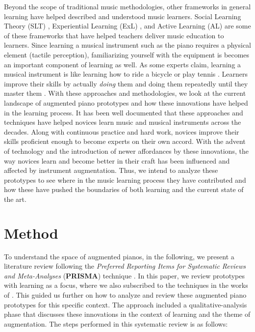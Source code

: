 \documentclass[sigconf, screen, review]{acmart}
\let\xtodo\todo
\renewcommand{\todo}[1]{\xtodo[inline]{#1}}
\newcommand{\todok}[1]{\xtodo[inline,color=green!50]{M and K: #1}}
\begin{document}
Beyond the scope of traditional music methodologies, other frameworks in general learning have helped described and understood music learners. Social Learning Theory (SLT) \cite{waldron2009exploring, gordon2011roots}, Experiential Learning (ExL) \cite{webster2011construction, russell2013mission}, and Active Learning (AL) \cite{scott2011contemplating, michael2003active} are some of these frameworks that have helped teachers deliver music education to learners. Since learning a musical instrument such as the piano requires a physical element (tactile perception), familiarizing yourself with the equipment is becomes an important component of learning as well. As some experts claim, learning a musical instrument is like learning how to ride a bicycle or play tennis \cite{}. Learners improve their skills by actually \textit{doing} them and doing them repeatedly until they master them \cite{stryker1997content}. With these approaches and methodologies, we look at the current landscape of augmented piano prototypes and how these innovations have helped in the learning process. It has been well documented that these approaches and techniques have helped novices learn music and musical instruments across the decades. Along with continuous practice and hard work, novices improve their skills proficient enough to become experts on their own accord. With the advent of technology and the introduction of newer affordances by these innovations, the way novices learn and become better in their craft has been influenced and affected by instrument augmentation. Thus, we intend to analyze these prototypes to see where in the music learning process they have contributed and how these have pushed the boundaries of both learning and the current state of the art. 

\todok{Please give feedback. Thank you!}
\section{Method}
To understand the space of augmented pianos, in the following, we present a literature review following the \textit{Preferred Reporting Items for Systematic Reviews and Meta-Analyses} (\textbf{PRISMA}) technique \cite{moher2009preferred}. In this paper, we review prototypes with learning as a focus, where we also subscribed to the techniques in the works of \cite{santos2013augmented, schneegass2016mobile, kljun2015transference, blattgerste2019augmented, mcpherson2015buttons, delgado2011state}. This guided us further on how to analyze and review these augmented piano prototypes for this specific context. The approach included a qualitative-analysis phase that discusses these innovations in the context of learning and the theme of augmentation. The steps performed in this systematic review is as follows: 
\end{document}
